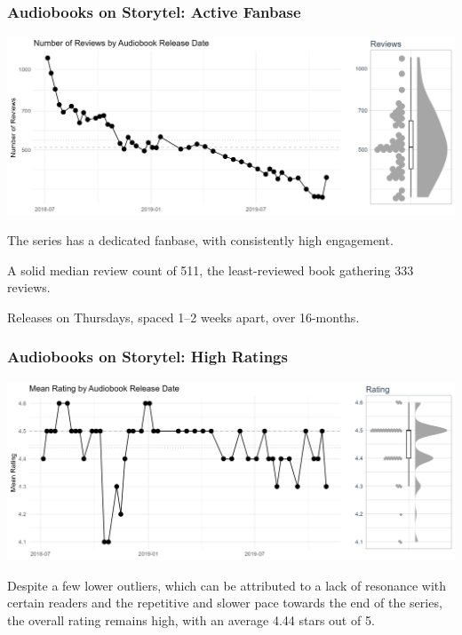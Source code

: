 \begin{frame}
    \frametitle{Audiobooks on Storytel: Active Fanbase}
    \includegraphics[width=\textwidth]{../R/figures/storytel_reviews}

    The series has a dedicated fanbase, with consistently high engagement.

    A solid median review count of 511, the least-reviewed book gathering 333 reviews.

    Releases on Thursdays, spaced 1--2 weeks apart, over 16-months.

\end{frame}

\begin{frame}
    \frametitle{Audiobooks on Storytel: High Ratings}
    \includegraphics[width=\textwidth]{../R/figures/storytel_ratings}

    Despite a few lower outliers, which can be attributed to a lack of resonance with certain readers and the
    repetitive and slower pace towards the end of the series, the overall rating remains high, with an average
    4.44 stars out of 5.

\end{frame}

